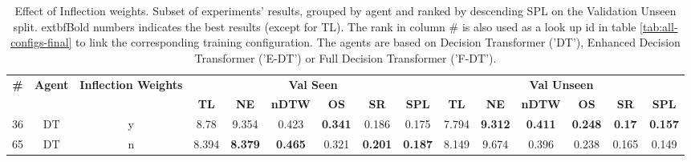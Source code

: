\begin{table}
\centering
\caption{\label{tab:inflection_weights}Effect of Inflection weights. Subset of experiments' results, grouped by agent and ranked by descending SPL on the Validation Unseen split. 	extbf{Bold} numbers indicates the best results (except for TL). The rank in column \# is also used as a look up id in table \ref{tab:all-configs-final} to link the corresponding training configuration.     \newline The agents are based on Decision Transformer ('DT'), Enhanced Decision Transformer ('E-DT') or Full Decision Transformer ('F-DT').}
\begin{tabular}{@{\hskip3pt}c@{\hskip3pt}c@{\hskip3pt}c@{\hskip3pt}c@{\hskip3pt}c@{\hskip3pt}c@{\hskip3pt}c@{\hskip3pt}c@{\hskip3pt}c@{\hskip3pt}c@{\hskip3pt}c@{\hskip3pt}c@{\hskip3pt}c@{\hskip3pt}c@{\hskip3pt}c}
\toprule
\textbf{\#} & \textbf{Agent} & \textbf{Inflection Weights} & \multicolumn{6}{c}{\textbf{Val Seen}} & \multicolumn{6}{c}{\textbf{Val Unseen}} \\
 \textbf{~} &     \textbf{~} &                  \textbf{~} &       \textbf{TL} &     \textbf{NE} &   \textbf{nDTW} &     \textbf{OS} &     \textbf{SR} &    \textbf{SPL} &         \textbf{TL} &     \textbf{NE} &   \textbf{nDTW} &     \textbf{OS} &    \textbf{SR} &    \textbf{SPL} \\
\midrule
         36 &             DT &                           y &              8.78 &           9.354 &           0.423 &  \textbf{0.341} &           0.186 &           0.175 &               7.794 &  \textbf{9.312} &  \textbf{0.411} &  \textbf{0.248} &  \textbf{0.17} &  \textbf{0.157} \\
         65 &             DT &                           n &             8.394 &  \textbf{8.379} &  \textbf{0.465} &           0.321 &  \textbf{0.201} &  \textbf{0.187} &               8.149 &           9.674 &           0.396 &           0.238 &          0.165 &           0.149 \\
\bottomrule
\end{tabular}
\end{table}
